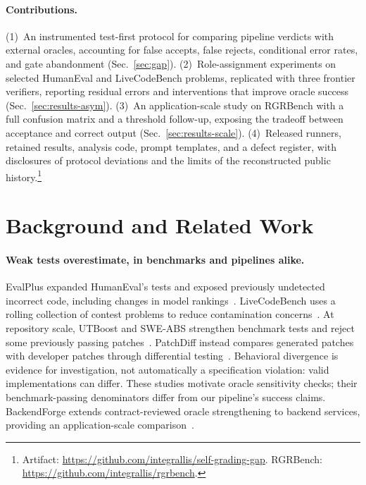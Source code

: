 \paragraph{Contributions.}
(1)~An instrumented test-first protocol for comparing pipeline verdicts with external
oracles, accounting for false accepts, false rejects, conditional error rates, and gate abandonment
(Sec.~\ref{sec:gap}).
(2)~Role-assignment experiments on selected HumanEval and LiveCodeBench problems, replicated
with three frontier verifiers, reporting residual errors and interventions that improve
oracle success (Sec.~\ref{sec:results-asym}).
(3)~An application-scale study on RGRBench with a full confusion matrix and a threshold
follow-up, exposing the tradeoff between acceptance and correct output
(Sec.~\ref{sec:results-scale}).
(4)~Released runners, retained results, analysis code, prompt templates, and a defect register,
with disclosures of protocol deviations and the limits of the reconstructed public
history.\footnote{Artifact: \url{https://github.com/integrallis/self-grading-gap}.
RGRBench: \url{https://github.com/integrallis/rgrbench}.}

\section{Background and Related Work}
\label{sec:related}

\paragraph{Weak tests overestimate, in benchmarks and pipelines alike.}
EvalPlus expanded HumanEval's tests and exposed previously undetected incorrect code,
including changes in model rankings~\cite{liu2023evalplus}. LiveCodeBench uses a rolling
collection of contest problems to reduce contamination concerns~\cite{jain2024livecodebench}.
At repository scale, UTBoost and SWE-ABS strengthen benchmark tests and reject some
previously passing patches~\cite{yu2025utboost,yu2026sweabs}. PatchDiff instead compares
generated patches with developer patches through differential testing~\cite{wang2025patchdiff}.
Behavioral divergence is evidence for investigation, not automatically a specification
violation: valid implementations can differ. These studies motivate oracle sensitivity
checks; their benchmark-passing denominators differ from our pipeline's success claims.
BackendForge extends contract-reviewed oracle strengthening to backend services,
providing an application-scale comparison~\cite{guo2026backendforge}.

